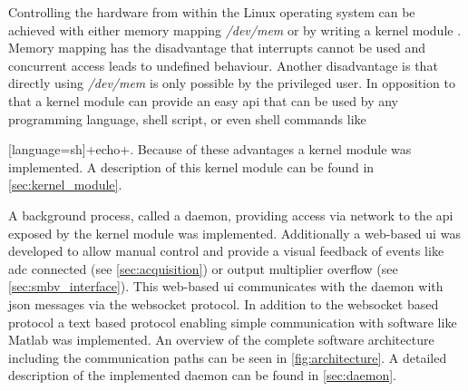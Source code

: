 \documentclass[12pt,a4paper,parskip=full,abstract=true,BCOR=12mm]{scrreprt}
\newcommand*{\SavedLstInline}{}
\DeclareRobustCommand*{\lstinline}{%
  \ifmmode
    \let\SavedBGroup\bgroup
    \def\bgroup{%
      \let\bgroup\SavedBGroup
      \hbox\bgroup
    }%
  \fi
  \SavedLstInline
}
\def\device#1{\mbox{\textit{#1}}}
\begin{document}
Controlling the hardware from within the Linux operating system can be
achieved with either memory mapping \device{/dev/mem} or by writing a kernel
module \cite{ldd}. Memory mapping has the disadvantage that interrupts cannot
be used and concurrent access leads to undefined behaviour. Another disadvantage
is that directly using \device{/dev/mem} is only possible by the
privileged user\cite{ldd}. In opposition to that a kernel module can provide an easy \gls{api} that
can be used by any programming language, shell script, or even shell commands
like \lstinline[language=sh]+echo+. Because of these advantages a kernel module
was implemented. A description of this kernel module can be found in
\cref{sec:kernel_module}.

A background process, called a daemon, providing access via network to the \gls{api}
exposed by the kernel module was implemented. Additionally a web-based \gls{ui} was developed
to allow manual control and provide a visual feedback of events like \gls{adc} connected (see
\cref{sec:acquisition}) or output multiplier overflow (see \cref{sec:smbv_interface}).
This web-based \gls{ui} communicates with the daemon with \gls{json} messages via
the websocket protocol. In addition to the websocket based protocol a text based protocol enabling
simple communication with software like Matlab was implemented. An overview of the
complete software architecture including the communication paths can be seen in
\cref{fig:architecture}. A detailed description of the implemented daemon can be
found in \cref{sec:daemon}.
\end{document}
